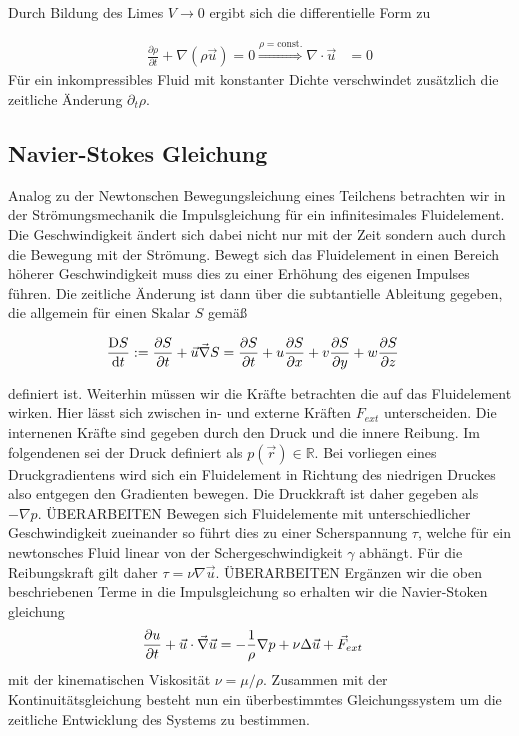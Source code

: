 Durch Bildung des Limes $V\rightarrow 0$ ergibt sich die differentielle Form zu

\begin{align}
     \frac{\partial \rho}{\partial t}  + \nabla(\rho \vec{u}) = 0 \overset{\rho = \mathrm{const.}}{\Rightarrow} \nabla \cdot \vec{u} &= 0
\end{align}
Für ein inkompressibles Fluid mit konstanter Dichte verschwindet zusätzlich die zeitliche Änderung $\partial_t \rho$.

\subsection{Navier-Stokes Gleichung}

Analog zu der Newtonschen Bewegungsleichung eines Teilchens betrachten wir in der Strömungsmechanik die Impulsgleichung für ein infinitesimales Fluidelement.
Die Geschwindigkeit ändert sich dabei nicht nur mit der Zeit sondern auch durch die Bewegung mit der Strömung. Bewegt sich das Fluidelement in einen
Bereich höherer Geschwindigkeit muss dies zu einer Erhöhung des eigenen Impulses führen.
Die zeitliche Änderung ist dann über die subtantielle Ableitung gegeben, die allgemein für einen Skalar $S$ gemäß

\begin{align}
    \frac{\Dif S}{\dif t} &:= \pdn[S]{t} + \vec{u}\vec{\nabla}S = \pdn[S]{t} + u\pdn[S]{x} + v\pdn[S]{y}+ w\pdn[S]{z}
\end{align}

definiert ist.
Weiterhin müssen wir die Kräfte betrachten die auf das Fluidelement wirken. Hier lässt sich zwischen in- und externe Kräften $F_{ext}$ unterscheiden.
Die internenen Kräfte sind gegeben durch den Druck und die innere Reibung.
Im folgendenen sei der Druck definiert als $p(\vec{r}) \in \mathbb{R}$. Bei vorliegen eines Druckgradientens wird sich ein Fluidelement in Richtung des niedrigen Druckes
also entgegen den Gradienten bewegen. Die Druckkraft ist daher gegeben als $-\nabla p$.
ÜBERARBEITEN
Bewegen sich Fluidelemente mit unterschiedlicher Geschwindigkeit zueinander so führt dies zu einer Scherspannung $\tau$, welche
für ein newtonsches Fluid linear von der Schergeschwindigkeit $\gamma$ abhängt. Für die Reibungskraft gilt daher  $\tau = \nu \nabla\vec{u}$.
ÜBERARBEITEN
Ergänzen wir die oben beschriebenen Terme in die Impulsgleichung so erhalten wir die Navier-Stoken gleichung
\begin{align}
    \pdn[u]{t} + \vec{u} \cdot \vec{\nabla} \vec{u} &= - \frac{1}{\rho} \nabla p + \nu \Delta \vec{u} + \vec{F}_{ext}
\end{align}
mit der kinematischen Viskosität $\nu = \mu /\rho$.
Zusammen mit der Kontinuitätsgleichung besteht nun ein überbestimmtes Gleichungssystem um die
zeitliche Entwicklung des Systems zu bestimmen.

